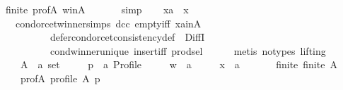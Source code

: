 \begin{isabellebody}
\ finite\ prof{\isacharunderscore}{\kern0pt}A\ w{\isacharunderscore}{\kern0pt}in{\isacharunderscore}{\kern0pt}A\ {\isachardoublequoteopen}{}{\isachardoublequoteclose}\isanewline
\ \ \ \ \isamarkupfalse%
\ simp\isanewline
\ \ \isamarkupfalse%
\ {\isachardoublequoteopen}xa\ {\isacharequal}{\kern0pt}\ x{\isachardoublequoteclose}\isanewline
\ \ \ \ \isamarkupfalse%
\ {\isachardoublequoteopen}{}{\isachardoublequoteclose}\ {\isachardoublequoteopen}{}{\isachardoublequoteclose}\ condorcet{\isacharunderscore}{\kern0pt}winner{\isachardot}{\kern0pt}simps\ dcc\ empty{\isacharunderscore}{\kern0pt}iff\ xa{\isacharunderscore}{\kern0pt}in{\isacharunderscore}{\kern0pt}A\isanewline
\ \ \ \ \ \ \ \ \ \ defer{\isacharunderscore}{\kern0pt}condorcet{\isacharunderscore}{\kern0pt}consistency{\isacharunderscore}{\kern0pt}def\ {\isachardoublequoteopen}{}{\isachardoublequoteclose}\ DiffI\isanewline
\ \ \ \ \ \ \ \ \ \ cond{\isacharunderscore}{\kern0pt}winner{\isacharunderscore}{\kern0pt}unique{}\ insert{\isacharunderscore}{\kern0pt}iff\ prod{\isachardot}{\kern0pt}sel{\isacharparenleft}{\kern0pt}{}{\isacharparenright}{\kern0pt}\isanewline
\ \ \ \ \isamarkupfalse%
\ {\isacharparenleft}{\kern0pt}metis\ {\isacharparenleft}{\kern0pt}no{\isacharunderscore}{\kern0pt}types{\isacharcomma}{\kern0pt}\ lifting{\isacharparenright}{\kern0pt}{\isacharparenright}{\kern0pt}\isanewline
{}\isamarkupfalse%
\isanewline
\ \ \isamarkupfalse%
\isanewline
\ \ \ \ A\ {\isacharcolon}{\kern0pt}{\isacharcolon}{\kern0pt}\ {\isachardoublequoteopen}{\isacharprime}{\kern0pt}a\ set{\isachardoublequoteclose}\ \isanewline
\ \ \ \ p\ {\isacharcolon}{\kern0pt}{\isacharcolon}{\kern0pt}\ {\isachardoublequoteopen}{\isacharprime}{\kern0pt}a\ Profile{\isachardoublequoteclose}\ \isanewline
\ \ \ \ w\ {\isacharcolon}{\kern0pt}{\isacharcolon}{\kern0pt}\ {\isachardoublequoteopen}{\isacharprime}{\kern0pt}a{\isachardoublequoteclose}\ \isanewline
\ \ \ \ x\ {\isacharcolon}{\kern0pt}{\isacharcolon}{\kern0pt}\ {\isachardoublequoteopen}{\isacharprime}{\kern0pt}a{\isachardoublequoteclose}\isanewline
\ \ \isamarkupfalse%
\isanewline
\ \ \ \ finite{\isacharcolon}{\kern0pt}\ {\isachardoublequoteopen}finite\ A{\isachardoublequoteclose}\ \isanewline
\ \ \ \ prof{\isacharunderscore}{\kern0pt}A{\isacharcolon}{\kern0pt}\ {\isachardoublequoteopen}profile\ A\ p{\isachardoublequoteclose}\ \isanewline

\end{isabellebody}
